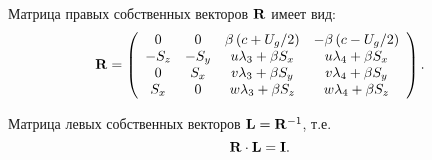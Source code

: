 Матрица правых собственных векторов ${\bf{R}}$ имеет вид:
\begin{equation}
  {\bf{R}} = \left( {\begin{array}{*{20}c}
   0 & 0 & {\beta \left( {c + U_g /2} \right)} & { - \beta \left( {c - U_g /2} \right)}  \\
   { - S_z } & { - S_y } & {u\lambda _3  + \beta S_x } & {u\lambda _4  + \beta S_x }  \\
   0 & {S_x } & {v\lambda _3  + \beta S_y } & {v\lambda _4  + \beta S_y }  \\
   {S_x } & 0 & {w\lambda _3  + \beta S_z } & {w\lambda _4  + \beta S_z }  \\
  \end{array}} \right).
\end{equation}

Матрица левых собственных векторов ${\bf{L}}={\bf{R}}^{-1}$, т.е. 
\begin{equation}
  {\bf{R}}\cdot{\bf{L}}={\bf{I}}.
\end{equation}

